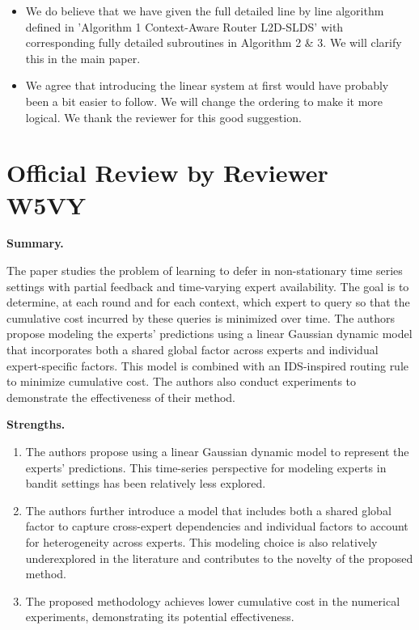 \begin{itemize}
    \begin{itemize}
        \item We do believe that we have given the full detailed line by line algorithm defined in 'Algorithm 1
        Context-Aware Router L2D-SLDS' with corresponding fully detailed subroutines in Algorithm 2 & 3. We will
        clarify this in the main paper.
        \item We agree that introducing the linear system at first would have probably been a bit easier to follow.
        We will change the ordering to make it more logical. We thank the reviewer for this good suggestion.
    \end{itemize}
\end{itemize}


\section*{Official Review by Reviewer W5VY}

\textbf{Summary.}

The paper studies the problem of learning to defer in non-stationary time series settings with partial feedback and time-varying expert availability. The goal is to determine, at each round and for each context, which expert to query so that the cumulative cost incurred by these queries is minimized over time. The authors propose modeling the experts' predictions using a linear Gaussian dynamic model that incorporates both a shared global factor across experts and individual expert-specific factors. This model is combined with an IDS-inspired routing rule to minimize cumulative cost. The authors also conduct experiments to demonstrate the effectiveness of their method.

\textbf{Strengths.}
\begin{enumerate}
    \item The authors propose using a linear Gaussian dynamic model to represent the experts' predictions. This time-series perspective for modeling experts in bandit settings has been relatively less explored.
    \item The authors further introduce a model that includes both a shared global factor to capture cross-expert dependencies and individual factors to account for heterogeneity across experts. This modeling choice is also relatively underexplored in the literature and contributes to the novelty of the proposed method.
    \item The proposed methodology achieves lower cumulative cost in the numerical experiments, demonstrating its potential effectiveness.
\end{enumerate}


